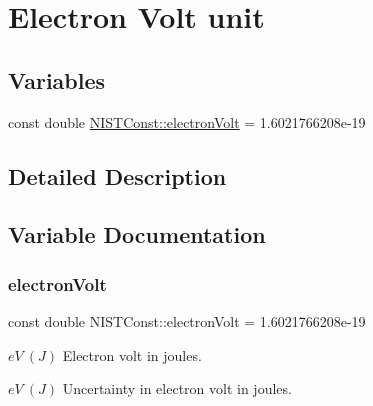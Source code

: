 \hypertarget{group___electron_volt_unit}{}\section{Electron Volt unit}
\label{group___electron_volt_unit}
\subsection*{Variables}
\begin{DoxyCompactItemize}
\item 
const double \hyperlink{group___electron_volt_unit_ga24c6771adb5c4de68575b1a77f0b2415}{N\+I\+S\+T\+Const\+::electron\+Volt} = 1.\+6021766208e-\/19
\end{DoxyCompactItemize}


\subsection{Detailed Description}


\subsection{Variable Documentation}
\mbox{\label{group___electron_volt_unit_ga24c6771adb5c4de68575b1a77f0b2415}} 
\subsubsection{\texorpdfstring{electron\+Volt}{electronVolt}}
{\footnotesize\ttfamily const double N\+I\+S\+T\+Const\+::electron\+Volt = 1.\+6021766208e-\/19}

$eV \ (J)$ Electron volt in joules.

$eV \ (J)$ Uncertainty in electron volt in joules. 
